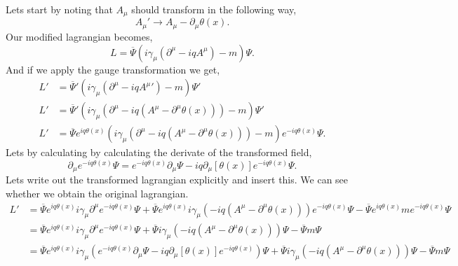 \documentclass[working, oneside]{../../../Preambles/tuftebook}
\begin{document}
\begin{solution}
Lets start by noting that $A_{\mu }$ should transform in the following way,
\[
A_{\mu }' \to A_{\mu } - \partial_{\mu }\theta \left( x \right) 
.\] 
Our modified lagrangian becomes,
\[
L = \overline{\Psi}\left( i \gamma_{\mu } \left( \partial^{\mu } - iqA^{\mu } \right) - m \right) \Psi
.\] 
And if we apply the gauge transformation we get,
\begin{align*}
    L' &= \overline{\Psi}'\left( i \gamma_{\mu } \left( \partial^{\mu } - iqA^{\mu }' \right) - m \right) \Psi'\\
    L' &= \overline{\Psi}'\left( i \gamma_{\mu } \left( \partial^{\mu } - iq\left( A^{\mu } - \partial^{\mu }\theta \left( x \right)  \right)  \right) - m \right) \Psi'\\
    L' &= \overline{\Psi}e^{iq\theta \left( x \right) }\left( i \gamma_{\mu } \left( \partial^{\mu } - iq\left( A^{\mu } - \partial^{\mu }\theta \left( x \right)  \right)  \right) - m \right) e^{-iq\theta \left( x \right)}\Psi
.\end{align*}
Lets by calculating by calculating the derivate of the transformed field,
\[
\partial_{\mu }e^{-iq\theta \left( x \right) }\Psi = e^{-iq\theta \left( x \right) }\partial_{\mu }\Psi - iq\partial_{\mu }\left[ \theta \left( x \right)  \right] e^{-iq\theta \left( x \right)}\Psi
.\] 
Lets write out the transformed lagrangian explicitly and insert this. We can see whether we obtain the original lagrangian.
\begin{align*}
    L' &= \overline{\Psi}e^{iq\theta \left( x \right) }i\gamma_{\mu }\partial^{\mu }e^{-iq\theta \left( x \right) }\Psi + \overline{\Psi}e^{iq\theta \left( x \right) }i\gamma_{\mu }\left( -iq\left( A^{\mu }-\partial^{\mu }\theta \left( x \right)  \right)  \right)e^{-iq\theta \left( x \right) }\Psi - \overline{\Psi}e^{iq\theta \left( x \right) }me^{-iq\theta \left( x \right) }\Psi  \\
     &= \overline{\Psi}e^{iq\theta \left( x \right) }i\gamma_{\mu }\partial^{\mu }e^{-iq\theta \left( x \right) }\Psi + \overline{\Psi}i\gamma_{\mu }\left( -iq\left( A^{\mu }-\partial^{\mu }\theta \left( x \right)  \right)  \right)\Psi - \overline{\Psi}m\Psi \\
     &= \overline{\Psi}e^{iq\theta \left( x \right) }i\gamma_{\mu }\left(   e^{-iq\theta \left( x \right) }\partial_{\mu }\Psi - iq\partial_{\mu }\left[ \theta \left( x \right)  \right] e^{-iq\theta \left( x \right)}\right)\Psi + \overline{\Psi}i\gamma_{\mu }\left( -iq\left( A^{\mu }-\partial^{\mu }\theta \left( x \right)  \right)  \right)\Psi - \overline{\Psi}m\Psi \\

\end{align*}
\end{solution}
\end{document}
